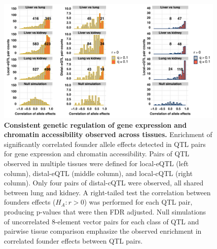 \documentclass[9pt,twocolumn,twoside]{gsajnl}
\begin{document}
\begin{figure}[hp]
\renewcommand{\familydefault}{\sfdefault}\normalfont
\centering
\includegraphics[width=\textwidth, trim={0in 0in 0in 0in}, clip]{figs/qtl_pair_cor_histograms.pdf}
\caption{\textbf{Consistent genetic regulation of gene expression and chromatin accessibility observed across tissues.} Enrichment of significantly correlated founder allele effects detected in QTL pairs for gene expression and chromatin accessibility. Pairs of QTL observed in multiple tissues were defined for local-eQTL (left column), distal-eQTL (middle column), and local-cQTL (right column). Only four pairs of distal-cQTL were observed, all shared between lung and kidney. A right-tailed test the correlation between founders effects ($H_{A}: r > 0$) was performed for each QTL pair, producing p-values that were then FDR adjusted. Null simulations of uncorrelated 8-element vector pairs for each class of QTL and pairwise tissue comparison emphasize the observed enrichment in correlated founder effects between QTL pairs.  
\label{fig:qtl_pair_histograms}}
\end{figure}
\end{document}

